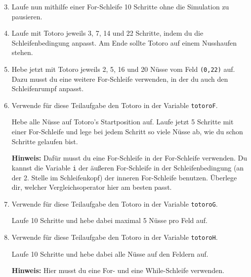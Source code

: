 \begin{enumerate}\setcounter{enumi}{2}
	\item
	Laufe nun mithilfe einer For-Schleife 10 Schritte ohne die Simulation zu pausieren.

	\item
	Laufe mit Totoro jeweils 3, 7, 14 und 22 Schritte, indem du die Schleifenbedingung anpasst.
	Am Ende sollte Totoro auf einem Nusshaufen stehen.
	
	\item
	Hebe jetzt mit Totoro jeweils 2, 5, 16 und 20 Nüsse vom Feld \texttt{(0,22)} auf.
	Dazu musst du eine weitere For-Schleife verwenden, in der du auch den Schleifenrumpf anpasst.
	
	\item
	Verwende für diese Teilaufgabe den Totoro in der Variable \lstinline{totoroF}.
	
	Hebe alle Nüsse auf Totoro's Startposition auf.
	Laufe jetzt 5 Schritte mit einer For-Schleife und lege bei jedem Schritt so viele Nüsse ab, wie du schon Schritte gelaufen bist.
	
	\textbf{Hinweis:} Dafür musst du eine For-Schleife in der For-Schleife verwenden.
	Du kannst die Variable \lstinline{i} der äußeren For-Schleife in der Schleifenbedingung (an der 2. Stelle im Schleifenkopf) der inneren For-Schleife benutzen.
	Überlege dir, welcher Vergleichsoperator hier am besten passt.
	
	\item
	Verwende für diese Teilaufgabe den Totoro in der Variable \lstinline{totoroG}.
	
	Laufe 10 Schritte und hebe dabei maximal 5 Nüsse pro Feld auf.
	
	\item
	Verwende für diese Teilaufgabe den Totoro in der Variable \lstinline{totoroH}.
	
	Laufe 10 Schritte und hebe dabei alle Nüsse auf den Feldern auf.
	
	\textbf{Hinweis:} Hier musst du eine For- und eine While-Schleife verwenden.
\end{enumerate}
\newpage
